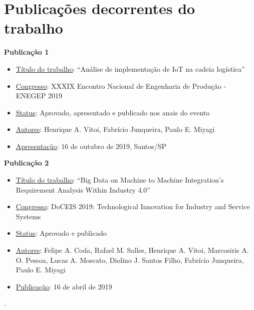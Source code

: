 \chapter{Publicações decorrentes do trabalho}
\label{cha:publicacoes}

	\textbf{Publicação 1} \cite{vitoi2019logistica}
	\begin{itemize}
		\item \underline{Título do trabalho}: “Análise de implementação de IoT na cadeia logística”
		\item \underline{Congresso}: XXXIX Encontro Nacional de Engenharia de Produção - ENEGEP 2019
		\item \underline{Status}: Aprovado, apresentado e publicado nos anais do evento
		\item \underline{Autores}:  Henrique A. Vitoi, Fabrício Junqueira, Paulo E. Miyagi
		\item \underline{Apresentação}: 16 de outubro de 2019, Santos/SP
	\end{itemize}
	
	\bigskip

	\textbf{Publicação 2} \cite{coda2019bigdata}
	\begin{itemize}
		\item \underline{Título do trabalho}: “Big Data on Machine to Machine Integration's Requirement Analysis Within Industry 4.0”
		\item \underline{Congresso}: DoCEIS 2019: Technological Innovation for Industry and Service Systems
		\item \underline{Status}: Aprovado e publicado
		\item \underline{Autores}:  Felipe A. Coda, Rafael M. Salles, Henrique A. Vitoi, Marcosiris A. O. Pessoa, Lucas A. Moscato, Diolino J. Santos Filho, Fabrício Junqueira, Paulo E. Miyagi
		\item \underline{Publicação}: 16 de abril de 2019
	\end{itemize}
	.